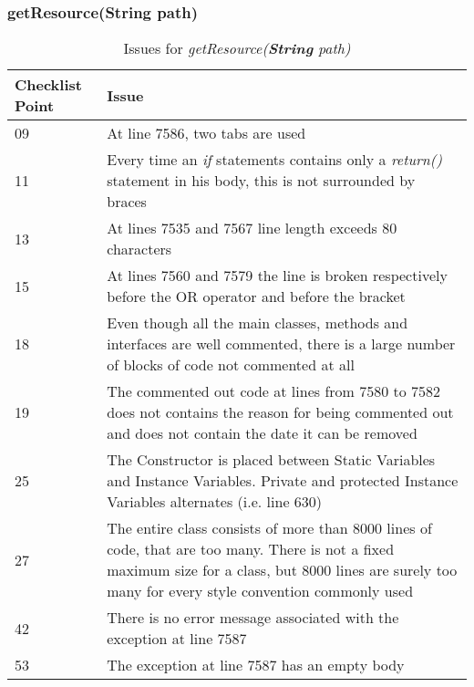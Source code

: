 \subsubsection{getResource(String path)}
\begin{table}[htbp]
\begin{center}
\begin{tabular}[t]{p{}p{}}

\hline
\textbf{Checklist Point} & \textbf{Issue} \\
\hline
09 & At line 7586, two tabs are used  \\
\hline
11 & Every time an \textit{if} statements contains only a \textit{return()} statement in his body, this is not surrounded by braces \\
\hline
13 & At lines 7535 and 7567 line length exceeds 80 characters \\
\hline
15 & At lines 7560 and 7579 the line is broken respectively before the OR operator and before the bracket \\
\hline
18 & Even though all the main classes, methods and interfaces are well commented, there is a large number of blocks of code not commented at all \\
\hline
19 & The commented out code at lines from 7580 to 7582 does not contains the reason for being commented out and does not contain the date it can be removed \\
\hline
25 & The Constructor is placed between Static Variables and  Instance Variables. Private and protected Instance Variables alternates (i.e. line 630)  \\
\hline
27 & The entire class consists of more than 8000 lines of code, that are too many. There is not a fixed maximum size for a class, but 8000 lines are surely too many for every style convention commonly used \\
\hline
42 & There is no error message associated with the exception at line 7587 \\
\hline
53 & The exception at line 7587 has an empty body \\
\hline

\end{tabular}
\end{center}
\caption{Issues for \textit{getResource(\textbf{String} path)}}
\end{table}
\clearpage

